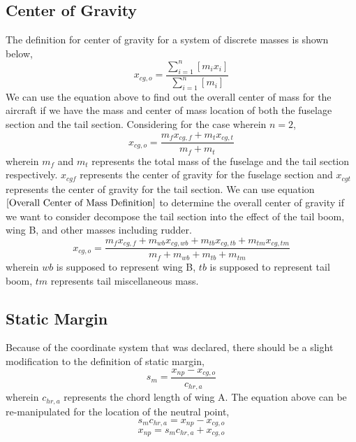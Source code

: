 \subsection{Center of Gravity}
\begin{comment}
\end{comment}
The definition for center of gravity for a system of discrete masses is shown below,
\begin{equation}
x_{cg,o} = \frac{\displaystyle \sum^{n}_{i = 1}\left[m_{i}x_{i}\right]}{\displaystyle \sum^{n}_{i = 1}\left[m_{i}\right]}
\label{Oveall Center of Mass Definition}
\end{equation}
We can use the equation above to find out the overall center of mass for the aircraft if we have the mass and center of mass location of both the fuselage section and the tail section. Considering for the case wherein $n = 2$,
$$x_{cg,o} = \frac{m_{f}x_{cg,f} + m_{t}x_{cg,t}}{m_{f} + m_{t}}$$
wherein $m_{f}$ and $m_{t}$ represents the total mass of the fuselage and the tail section respectively. $x_{cgf}$ represents the center of gravity for the fuselage section and $x_{cgt}$ represents the center of gravity for the tail section. We can use equation $\ref{Overall Center of Mass Definition}$ to determine the overall center of gravity if we want to consider decompose the tail section into the effect of the tail boom, wing B, and other masses including rudder.
\begin{equation}
x_{cg,o} = \frac{m_{f}x_{cg,f} + m_{wb}x_{cg,wb} + m_{tb}x_{cg,tb} + m_{tm}x_{cg,tm}}{m_{f} + m_{wb} + m_{tb} + m_{tm}} 
\label{center of gravity 3 objects}\end{equation}
wherein $wb$ is supposed to represent wing B, $tb$ is supposed to represent tail boom, $tm$ represents tail miscellaneous mass.

\subsection{Static Margin}
\begin{comment}
\end{comment}
Because of the coordinate system that was declared, there should be a slight modification to the definition of static margin,
$$s_{m} = \frac{x_{np} - x_{cg,o}}{c_{hr,a}}$$
wherein $c_{hr,a}$ represents the chord length of wing A. The equation above can be re-manipulated for the location of the neutral point,
$$s_{m}c_{hr,a} = x_{np} - x_{cg,o}$$
\begin{equation}
x_{np} = s_{m}c_{hr,a} + x_{cg,o}
\label{neutral point Static Margin}\end{equation}

